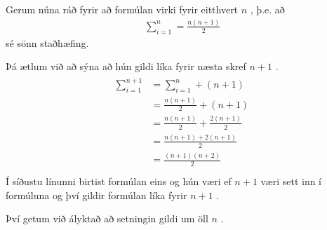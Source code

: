 \documentclass[a4paper,10pt,icelandic]{sphinxmanual}
\begin{document}

Gerum núna ráð fyrir að formúlan virki fyrir eitthvert \(n\) , þ.e. að
\begin{equation*}
\begin{split}\sum_{i=1}^n = \frac{n(n+1)}{2}\end{split}
\end{equation*}
sé sönn staðhæfing.

Þá ætlum við að sýna að hún gildi líka fyrir næsta skref \(n+1\) .
\begin{equation*}
\begin{split}\begin{aligned}
  \sum_{i=1}^{n+1} &= \sum_{i=1}^n + (n+1) \\
  &= \frac{n(n+1)}{2} + (n+1) \\
  &= \frac{n(n+1)}{2} + \frac{2(n+1)}{2} \\
  &=\frac{n(n+1)+2(n+1)}{2}\\
  &= \frac{(n+1)(n+2)}{2} \\
\end{aligned}\end{split}
\end{equation*}
Í síðustu línunni birtist formúlan eins og hún væri ef \(n+1\) væri sett inn í formúluna og því gildir formúlan líka fyrir \(n+1\) .

Því getum við ályktað að setningin gildi um öll \(n\) .
\end{document}
